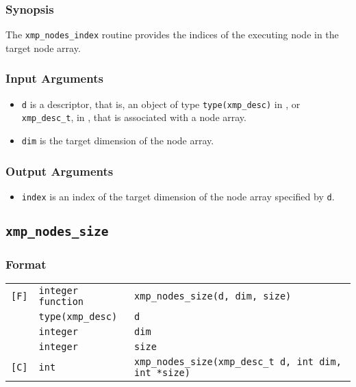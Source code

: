 \subsubsection*{Synopsis}

The {\tt xmp\_nodes\_index} routine provides the indices of the
executing node in the target node array.

\subsubsection*{Input Arguments}

\begin{itemize}
 \item {\tt d} is a descriptor, that is, an object of type 
       {\tt type(xmp\_desc)} in {\XMPF}, or {\tt xmp\_desc\_t},
       in {\XMPC}, that is associated with a node array.
 \item {\tt dim} is the target dimension of the node array.
\end{itemize}

\subsubsection*{Output Arguments}

\begin{itemize}
 \item {\tt index} is an index of the target dimension of the node array
       specified by {\tt d}.
\end{itemize}


\subsection{\tt xmp\_nodes\_size}

\subsubsection*{Format}

\begin{tabular}{lll}

\verb![F]!& {\tt integer function}& {\tt xmp\_nodes\_size(d, dim, size)}\\
          & {\tt type(xmp\_desc)} & {\tt d}\\
          & {\tt integer} & {\tt dim}\\
          & {\tt integer} & {\tt size}\\

\verb![C]!&  {\tt int}& {\tt xmp\_nodes\_size(xmp\_desc\_t d, int dim, int *size)}\\

\end{tabular}

